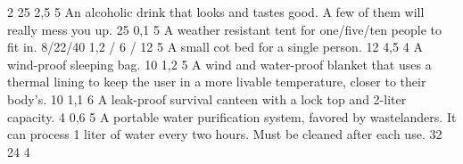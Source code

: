 \begin{multicols}{2}
    {25}
    {2,5}
    {5}
	{An alcoholic drink that looks and tastes good.
		A few of them will really mess you up.}
	{25}
	{0,1}
	{5}
    {A weather resistant tent for one/five/ten people to fit in.}
    {8/22/40}
    {1,2 / 6 / 12}
    {5}
    {A small cot bed for a single person.}
    {12}
    {4,5}
    {4}
    {A wind-proof sleeping bag.}
    {10}
    {1,2}
    {5}
    {A wind and water-proof blanket that uses a thermal lining
        to keep the user in a more livable temperature,
        closer to their body's.}
    {10}
    {1,1}
    {6}
    {A leak-proof survival canteen with a lock top and 2-liter capacity.}
    {4}
    {0,6}
    {5}
    {A portable water purification system, favored by wastelanders.
        It can process 1 liter of water every two hours.
        Must be cleaned after each use.}
    {32}
    {24}
    {4}
\end{multicols}

\pagebreak[3]
